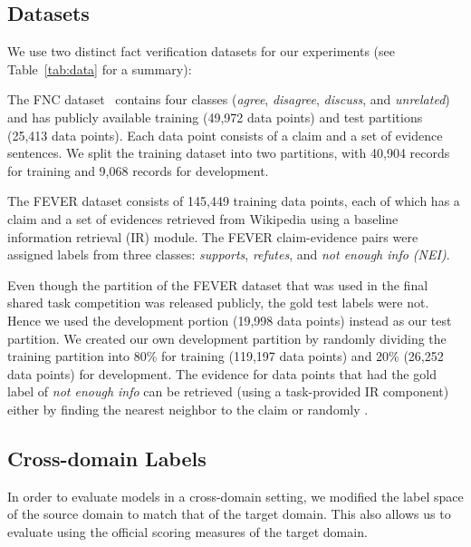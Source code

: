 \documentclass[11pt,a4paper]{article}
\begin{document}
\subsection{Datasets}
We use two distinct fact verification datasets for our experiments (see Table~\ref{tab:data} for a summary):

{} 
The FNC dataset~\citep{pomerleau2017fake} contains four classes (\textit{agree}, \textit{disagree}, \textit{discuss}, and \textit{unrelated}) and has publicly available training (49,972 data points) and test partitions (25,413 data points). Each data point consists of a claim and a set of evidence sentences.  We split the training dataset into two partitions, with 40,904 records for training and 9,068 records for development.




{} The FEVER \cite{thorne2018fever} dataset consists of 145,449 training data points, each of which has a claim and a set of evidences retrieved from Wikipedia using a baseline information retrieval (IR) module.
The FEVER claim-evidence pairs were assigned labels from three classes: \textit{supports}, \textit{refutes}, and \textit{not enough info (NEI)}.  

Even though the partition of the FEVER dataset that was used in the final shared task competition was released publicly, the gold test labels were not. Hence we used the development portion (19,998 data points) instead as our test partition. We created our own development partition by randomly dividing the training partition into 80\% for training (119,197 data points) and 20\% (26,252 data points) for development.  The evidence for data points that had the gold label of \textit{not enough info} can be retrieved (using a task-provided IR component) either by finding the nearest neighbor to the claim or randomly \cite{thorne2018fever}. 


\subsection{Cross-domain Labels}
\label{sec:crossdomain}


In order to evaluate models in a cross-domain setting, we modified the label space of the source domain to match that of the target domain. This  also allows us to evaluate using the official scoring measures of the target domain.
\end{document}

